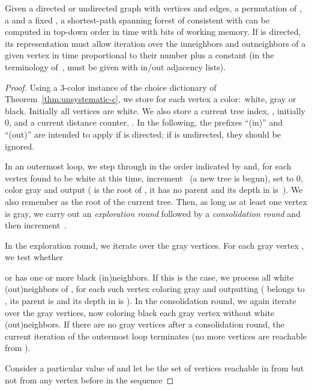 \documentclass[envcountsame,envcountsect,undated,nolinenumbers]{lnthi}
\begin{document}
\begin{theorem}
\label{thm:bfs}Given a directed or undirected graph 
with  vertices and  edges,
a permutation  of , a 
and a fixed ,
a shortest-path
spanning forest of  consistent with 
can be computed in
top-down order in  time with
 bits of working memory.
If  is directed, its representation must
allow iteration over the inneighbors and
outneighbors of a given
vertex in time proportional to their number
plus a constant
(in the terminology
of~\cite{ElmHK15},
 must be given with in/out adjacency lists).
\end{theorem}

\begin{proof}
Using a 3-color instance of the choice dictionary
of Theorem~\ref{thm:unsystematic-c},
we store for each vertex  a color:\
white, gray or black.
Initially all vertices are white.
We also store a current tree index, ,
initially 0, and a current distance counter, .
In the following, the prefixes ``(in)'' and ``(out)''
are intended to apply if  is directed;
if  is undirected, they should be ignored.

In an outermost loop, we step through  in
the order indicated by  and,
for each vertex  found to be white at this time,
increment~
(a new tree  is begun), set  to 0,
color  gray and output
 ( is the root  of , it
has no parent and its depth in  is~).
We also remember 
as the root
of the current tree.
Then, as long as at least one vertex is gray,
we carry out an \emph{exploration round}
followed by a \emph{consolidation round}
and then increment~.

In the exploration round, we
iterate over the gray vertices.
For each gray vertex , we test whether 
 
or
 has one or more black (in)neighbors.
If this is the case, we
process all white (out)neighbors of ,
for each such vertex 
coloring  gray and outputting 
( belongs to , its parent is 
and its depth in  is ).
In the consolidation round, we again iterate
over the gray vertices, now coloring black each gray vertex
without white (out)neighbors.
If there are no gray vertices after a
consolidation round,
the current iteration of the outermost loop
terminates (no more vertices are reachable from ).

Consider a particular value of  and
let  be the set of vertices 
reachable in  from 
but not from any vertex before  in the sequence


\end{proof}
\end{document}
